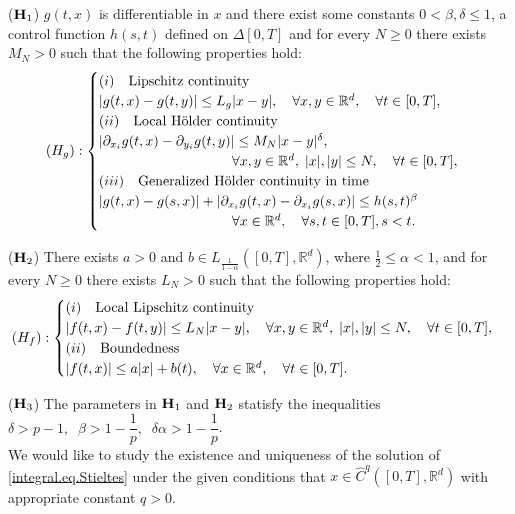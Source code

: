 \documentclass[10pt]{article}
\numberwithin{equation}{section} %
\newcommand{\R}{\ensuremath{\mathbb{R}}}
\begin{document}
 (${\textbf H}_1$) $g(t,x)$ is differentiable in $x$ and there exist some constants $0<\beta,\delta\leq 1$, a control function $h(s,t)$ defined on $\Delta[0,T]$ and for every $N\geq 0$ there exists $M_N>0$ such that the following properties hold:
 $$
 (H_g) : \begin{cases}
 (i)\quad \hbox{Lipschitz continuity}\\
 |g(t,x) - g(t,y)| \leq L_g |x-y|,\quad \forall x,y \in\R^d, \quad \forall t\in [0,T],\\
 (ii) \quad \hbox{Local H\"older continuity}\\
 |\partial_{x_i}g(t,x)- \partial_{y_i}g(t,y)| \leq M_N |x-y|^\delta, \\
 \hspace*{3cm} \quad \forall  x,y\in\R^d,\; |x|,|y|\leq N,\quad \forall t\in [0,T],\\
 (iii) \quad \hbox{Generalized H\"older continuity in time} \\
 |g(t,x)-g(s,x)| + |\partial_{x_i}g(t,x) - \partial_{x_i}g(s,x)| \leq h(s,t)^\beta\\
  \hspace*{3cm} \quad  \forall x\in\R^d, \quad\forall s,t\in [0,T], s<t.
  \end{cases}
  $$
  
  (${\textbf H}_2$) There exists $a>0$ and $b\in L_{\frac{1}{1-\alpha}}([0,T],\R^d)$, where $\frac{1}{2} \leq \alpha <1 $, and for every $N\geq 0$ there exists $L_N >0$ such that the following properties hold:
  $$
 (H_f) : \begin{cases}
 (i)\quad \hbox{Local Lipschitz continuity}\\
 |f(t,x) - f(t,y)| \leq L_N |x-y|, \quad \forall x,y\in\R^d,\;|x|,|y|\leq N, \quad\forall t\in [0,T],\\
 (ii) \quad \hbox{Boundedness}\\
 |f(t,x)| \leq a |x| + b(t), \quad\forall x\in \R^d,\quad \forall t\in [0,T].\\
  \end{cases}
  $$
  
  (${\textbf H}_3$) The parameters in ${\textbf H}_1$ and ${\textbf H}_2$ statisfy the inequalities $\delta>p-1,\;\;\beta >1-\dfrac{1}{p},\;\; \delta\alpha > 1-\dfrac{1}{p}$. \\  

We would like to study the existence and uniqueness of the solution of \eqref{integral.eq.Stieltes} under the given conditions that $x\in \widehat{C}^{q}([0,T],\R^d)$ with appropriate constant $q>0$.
\end{document}
